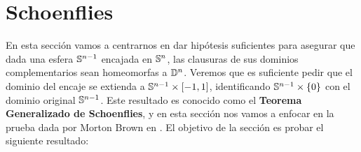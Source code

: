 \chapter{Schoenflies}








En esta sección vamos a centrarnos en dar hipótesis suficientes para asegurar que dada una esfera $\mathbb{S}^{n-1}$ encajada en $\mathbb{S}^n$, las clausuras de sus dominios complementarios sean homeomorfas a $\mathbb{D}^n$. Veremos que es suficiente pedir que el dominio del encaje se extienda a $\mathbb{S}^{n-1}\times [-1,1]$, identificando $\mathbb{S}^{n-1}\times\{0\}$ con el dominio original $\mathbb{S}^{n-1}$. Este resultado es conocido como el \textbf{Teorema Generalizado de Schoenflies}, y en esta sección nos vamos a enfocar en la prueba dada por Morton Brown en \cite{mbsch}. El objetivo de la sección es probar el siguiente resultado:%

